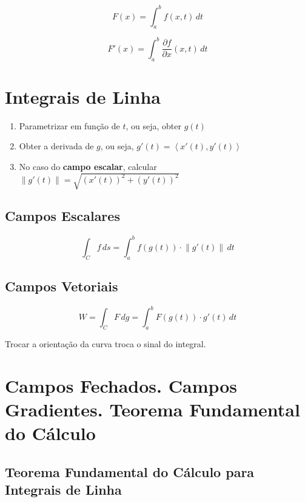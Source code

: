 \documentclass[11pt, a4paper]{article}
\begin{document}
\begin{equation*}
    F(x) = \int_{a}^{b} f(x, t) \, dt
\end{equation*}

\begin{equation*}
    F'(x) = \int_{a}^{b} \frac{\partial f}{\partial x}(x, t) \, dt
\end{equation*}

\section{Integrais de Linha}

\begin{enumerate}
    \item Parametrizar em função de $t$, ou seja, obter $g(t)$
    \item Obter a derivada de $g$, ou seja, $g'(t) = \left\langle x'(t), y'(t)\right\rangle$
    \item No caso do \textbf{campo escalar}, calcular $\left\lVert g'(t) \right\rVert = \sqrt{\left(x'(t)\right)^2 + \left(y'(t)\right)^2}$
\end{enumerate}

\subsection{Campos Escalares}

\begin{equation*}
    \int_{C} f \, ds =
    \int_{a}^{b} f\left(g(t)\right) \cdot \left\lVert g'(t) \right\rVert  \, dt
\end{equation*}

\subsection{Campos Vetoriais}

\begin{equation*}
    W = \int_{C} F \, dg =
    \int_{a}^{b} F\left(g(t)\right) \cdot g'(t) \, dt
\end{equation*}

Trocar a orientação da curva troca o sinal do integral.

\section{Campos Fechados. Campos Gradientes. Teorema Fundamental do Cálculo}

\subsection{Teorema Fundamental do Cálculo para Integrais de Linha}
\end{document}
